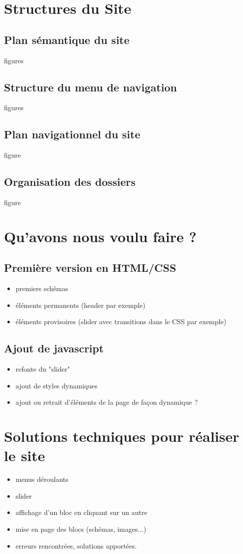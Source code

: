 \documentclass{scrartcl}
\begin{document}
\section{Structures du Site}
\subsection{Plan sémantique du site}
figures
\subsection{Structure du menu de navigation}
figures
\subsection{Plan navigationnel du site}
figure
\subsection{Organisation des dossiers}
figure

\section{Qu'avons nous voulu faire ?}
\subsection{Première version en HTML/CSS}
\begin{itemize}
\item premiers schémas
\item éléments permanents (header par exemple)
\item éléments provisoires (slider avec transitions dans le CSS par exemple)
\end{itemize}


\subsection{Ajout de javascript}
\begin{itemize}
\item refonte du "slider"
\item ajout de styles dynamiques
\item ajout ou retrait d'éléments de la page de façon dynamique ?
\end{itemize}


\section{Solutions techniques pour réaliser le site}
\begin{itemize}
\item menus déroulants
\item slider
\item affichage d’un bloc en cliquant sur un autre
\item mise en page des blocs (schémas, images...)
\item erreurs rencontrées, solutions apportées. 

\end{itemize}
\end{document}
